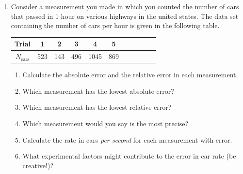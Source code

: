 \begin{enumerate}
  \item Consider a measurement you made in which you counted the number of cars that passed in 1 hour on various highways in the united states. The data set containing the number of cars per hour is given in the following table.
  \begin{center}
    \begin{tabular}{|c | c | c | c | c | c | c | c | c | c | c|}
      \hline
      Trial&1&2&3&4&5 \\ \hline
      $N_{\text{cars}}$&523&143&496&1045&869 \\
      \hline
    \end{tabular}
  \end{center}
  \begin{enumerate}
    \item Calculate the absolute error and the relative error in each measurement.
    \item Which measurement has the lowest absolute error?
    \item Which measurement has the lowest relative error?
    \item Which measurement would you say is the most precise?
    \item Calculate the rate in cars {\it{per second}} for each measurement with error.
    \item What experimental factors might contribute to the error in car rate (be creative!)?
  \end{enumerate}
\end{enumerate}
\newpage
\thispagestyle{plain}
